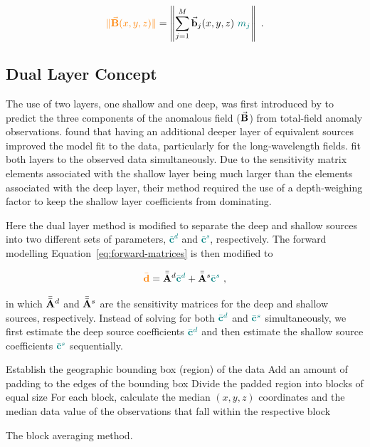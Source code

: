 \begin{equation}
\textcolor{orange}{\lVert \vec{\mathbf{B}}(x,y,z) \rVert} = \left\lVert 
    \sum_{j=1}^{M} \vec{\mathbf{b}}_{j}(x,y,z)\ \textcolor{teal}{m_j} 
\right\rVert
\ .
\end{equation}


\subsection{Dual Layer Concept}

The use of two layers, one shallow and one deep, was first introduced by \citet{Li2020} to predict the three components of the anomalous field ($\vec{\mathbf{B}}$) from total-field anomaly observations. \citet{Li2020} found that having an additional deeper layer of equivalent sources improved the model fit to the data, particularly for the long‐wavelength fields. \citet{Li2020} fit both layers to the observed data simultaneously. Due to the sensitivity matrix elements associated with the shallow layer being much larger than the elements associated with the deep layer, their method required the use of a depth-weighing factor to keep the shallow layer coefficients from dominating.

Here the dual layer method is modified to separate the deep and shallow sources into two different sets of parameters, \textcolor{teal}{$\bar{\mathbf{c}}^d$} and \textcolor{teal}{$\bar{\mathbf{c}}^s$}, respectively.
The forward modelling Equation~\ref{eq:forward-matrices} is then modified to

\begin{equation}
    \textcolor{orange}{\bar{\mathbf{d}}} = \bar{\bar{\mathbf{A}}}^d \textcolor{teal}{\bar{\mathbf{c}}^d}
    +  \bar{\bar{\mathbf{A}}}^s \textcolor{teal}{\bar{\mathbf{c}}^s}
    \ ,
\end{equation}

\noindent
in which $\bar{\bar{\mathbf{A}}}^d$ and $\bar{\bar{\mathbf{A}}}^s$ are the sensitivity matrices for the deep and shallow sources, respectively.
Instead of solving for both $\textcolor{teal}{\bar{\mathbf{c}}^d}$ and $\textcolor{teal}{\bar{\mathbf{c}}^s}$ simultaneously, we first estimate the deep source coefficients $\textcolor{teal}{\bar{\mathbf{c}}^d}$ and then estimate the shallow source coefficients $\textcolor{teal}{\bar{\mathbf{c}}^s}$ sequentially.

\begin{algorithm}[!htb]
  Establish the geographic bounding box (region) of the data
  \;
  Add an amount of padding to the edges of the bounding box
  \;
  Divide the padded region into blocks of equal size
  \;
  For each block, calculate the median $(x, y, z)$ coordinates and the median data value of the observations that fall within the respective block
  \;
  \BlankLine
  \caption{The block averaging method.}
  \label{alg:block_averaging}
\end{algorithm}

